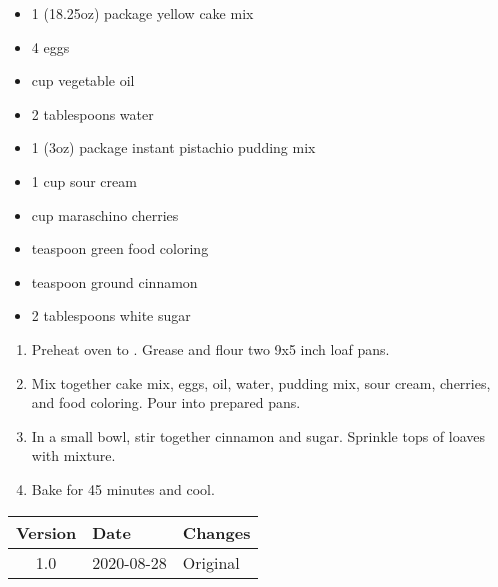 \ingredients
\begin{multicols}{2}
\raggedcolumns %
\begin{itemize}
    \item 1 (18.25oz) package yellow cake mix
    \item 4 eggs
    \item {} cup vegetable oil
    \item 2 tablespoons water
    \item 1 (3oz) package instant pistachio pudding mix
    \item 1 cup sour cream
    \item {} cup maraschino cherries
    \item {} teaspoon green food coloring
    \item {} teaspoon ground cinnamon
    \item 2 tablespoons white sugar
\end{itemize}
\end{multicols}
 
\instructions
\begin{enumerate}
    \item Preheat oven to . Grease and flour two 9x5 inch loaf pans.
    \item Mix together cake mix, eggs, oil, water, pudding mix, sour cream, cherries, and food coloring. Pour into prepared pans. 
    \item In a small bowl, stir together cinnamon and sugar. Sprinkle tops of loaves with mixture. 
    \item Bake for 45 minutes and cool. 
\end{enumerate}

\vfill

\begin{tabular}{ c | l | l }
  \textbf{Version} & \textbf{Date} & \textbf{Changes} \\ 
  \hline		
  1.0 & 2020-08-28 & Original \\
\end{tabular}
